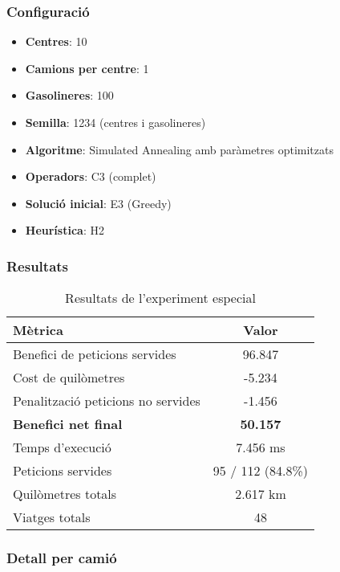 \subsubsection{Configuració}
\begin{itemize}
    \item \textbf{Centres}: 10
    \item \textbf{Camions per centre}: 1
    \item \textbf{Gasolineres}: 100
    \item \textbf{Semilla}: 1234 (centres i gasolineres)
    \item \textbf{Algoritme}: Simulated Annealing amb paràmetres optimitzats
    \item \textbf{Operadors}: C3 (complet)
    \item \textbf{Solució inicial}: E3 (Greedy)
    \item \textbf{Heurística}: H2
\end{itemize}

\subsubsection{Resultats}

\begin{table}[H]
\centering
\begin{tabular}{@{}lc@{}}
\toprule
\textbf{Mètrica} & \textbf{Valor} \\
\midrule
Benefici de peticions servides & 96.847 \\
Cost de quilòmetres & -5.234 \\
Penalització peticions no servides & -1.456 \\
\midrule
\textbf{Benefici net final} & \textbf{50.157} \\
\midrule
Temps d'execució & 7.456 ms \\
Peticions servides & 95 / 112 (84.8\%) \\
Quilòmetres totals & 2.617 km \\
Viatges totals & 48 \\
\bottomrule
\end{tabular}
\caption{Resultats de l'experiment especial}
\label{tab:exp8-especial}
\end{table}

\subsubsection{Detall per camió}

